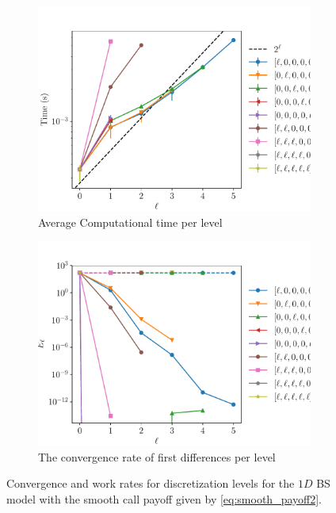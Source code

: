 \documentclass[11pt]{article}
\begin{document}
\begin{figure}[!h]
	\centering
	\begin{subfigure}{.5\textwidth}
		\centering
		\includegraphics[width=0.95\linewidth]{./figures/1D_BS_4_steps_smooth_second_payoff_eps_10_5/level_work.pdf}
		\caption{Average Computational time per level}
		\label{fig:misc_1D_BS_4_steps_smooth_second_payoff_eps_10_5_sub3}
	\end{subfigure}%
	\begin{subfigure}{.5\textwidth}
		\centering
		\includegraphics[width=0.95\linewidth]{./figures/1D_BS_4_steps_smooth_second_payoff_eps_10_5/levels_error_rate.pdf}
		\caption{ The convergence rate of first differences per level}
		\label{fig:misc_1D_BS_4_steps_smooth_second_payoff_eps_10_5_sub4}
	\end{subfigure}%
	\caption{Convergence and work rates for discretization levels for the $1D$ BS model with the smooth call payoff given by \eqref{eq:smooth_payoff2}.}
	\label{fig:misc_1D_BS_4_steps_smooth_second_payoff_eps_10_5_2}
\end{figure}
\end{document}
